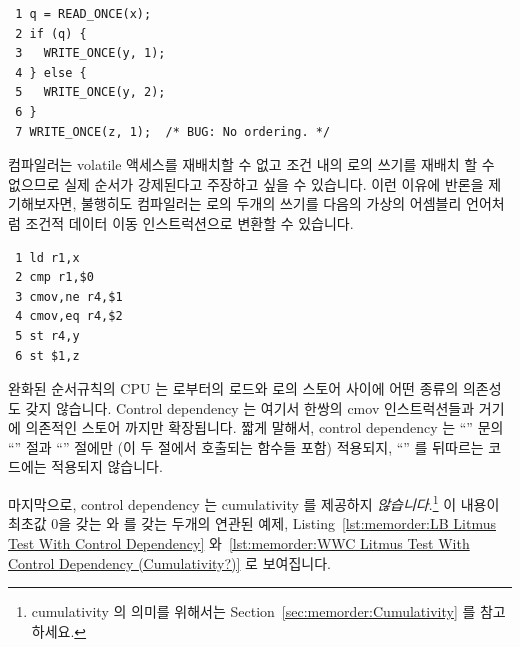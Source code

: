 \vspace{5pt}
\begin{minipage}[t]{\columnwidth}
\scriptsize
\begin{verbatim}
 1 q = READ_ONCE(x);
 2 if (q) {
 3   WRITE_ONCE(y, 1);
 4 } else {
 5   WRITE_ONCE(y, 2);
 6 }
 7 WRITE_ONCE(z, 1);  /* BUG: No ordering. */
\end{verbatim}
\end{minipage}
\vspace{5pt}

컴파일러는 volatile 액세스를 재배치할 수 없고 조건 내의  로의 쓰기를
재배치 할 수 없으므로 실제 순서가 강제된다고 주장하고 싶을 수 있습니다.
이런 이유에 반론을 제기해보자면, 불행히도 컴파일러는  로의 두개의 쓰기를
다음의 가상의 어셈블리 언어처럼 조건적 데이터 이동 인스트럭션으로 변환할 수
있습니다.

\vspace{5pt}
\begin{minipage}[t]{\columnwidth}
\scriptsize
\begin{verbatim}
 1 ld r1,x
 2 cmp r1,$0
 3 cmov,ne r4,$1
 4 cmov,eq r4,$2
 5 st r4,y
 6 st $1,z
\end{verbatim}
\end{minipage}
\vspace{5pt}

완화된 순서규칙의 CPU 는  로부터의 로드와  로의 스토어 사이에 어떤
종류의 의존성도 갖지 않습니다.
Control dependency 는 여기서 한쌍의 cmov 인스트럭션들과 거기에 의존적인 스토어
까지만 확장됩니다.
짧게 말해서, control dependency 는 ``'' 문의 ``'' 절과
``'' 절에만 (이 두 절에서 호출되는 함수들 포함) 적용되지, ``''
를 뒤따르는 코드에는 적용되지 않습니다.

마지막으로, control dependency 는 cumulativity 를 제공하지 \emph{않습니다}.\footnote{
	cumulativity 의 의미를 위해서는 Section~\ref{sec:memorder:Cumulativity}
	를 참고하세요.}
이 내용이 최초값 0을 갖는  와  를 갖는 두개의 연관된 예제,
Listing~\ref{lst:memorder:LB Litmus Test With Control Dependency}
와~\ref{lst:memorder:WWC Litmus Test With Control Dependency (Cumulativity?)}
로 보여집니다.
\iffalse


